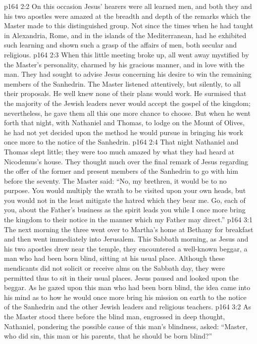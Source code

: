 \vs p164 2:2 On this occasion Jesus’ hearers were all learned men, and both they and his two apostles were amazed at the breadth and depth of the remarks which the Master made to this distinguished group. Not since the times when he had taught in Alexandria, Rome, and in the islands of the Mediterranean, had he exhibited such learning and shown such a grasp of the affairs of men, both secular and religious.
\vs p164 2:3 When this little meeting broke up, all went away mystified by the Master’s personality, charmed by his gracious manner, and in love with the man. They had sought to advise Jesus concerning his desire to win the remaining members of the Sanhedrin. The Master listened attentively, but silently, to all their proposals. He well knew none of their plans would work. He surmised that the majority of the Jewish leaders never would accept the gospel of the kingdom; nevertheless, he gave them all this one more chance to choose. But when he went forth that night, with Nathaniel and Thomas, to lodge on the Mount of Olives, he had not yet decided upon the method he would pursue in bringing his work once more to the notice of the Sanhedrin.\plusone
\vs p164 2:4 That night Nathaniel and Thomas slept little; they were too much amazed by what they had heard at Nicodemus’s house. They thought much over the final remark of Jesus regarding the offer of the former and present members of the Sanhedrin to go with him before the seventy. The Master said: \textcolor{ubdarkred}{“No, my brethren, it would be to no purpose. You would multiply the wrath to be visited upon your own heads, but you would not in the least mitigate the hatred which they bear me. Go, each of you, about the Father’s business as the spirit leads you while I once more bring the kingdom to their notice in the manner which my Father may direct.”}
\vs p164 3:1 The next morning the three went over to Martha’s home at Bethany for breakfast and then went immediately into Jerusalem. This Sabbath morning, as Jesus and his two apostles drew near the temple, they encountered a well\hyp{}known beggar, a man who had been born blind, sitting at his usual place. Although these mendicants did not solicit or receive alms on the Sabbath day, they were permitted thus to sit in their usual places. Jesus paused and looked upon the beggar. As he gazed upon this man who had been born blind, the idea came into his mind as to how he would once more bring his mission on earth to the notice of the Sanhedrin and the other Jewish leaders and religious teachers.
\vs p164 3:2 As the Master stood there before the blind man, engrossed in deep thought, Nathaniel, pondering the possible cause of this man’s blindness, asked: “Master, who did sin, this man or his parents, that he should be born blind?”
